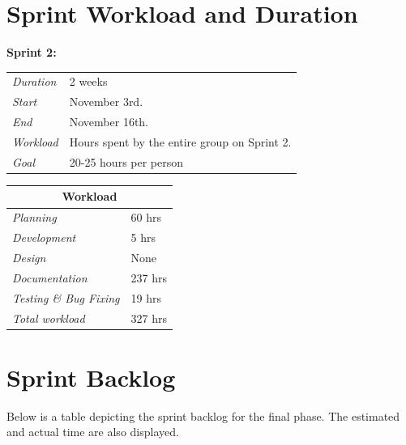\section{Sprint Workload and Duration}
\label{sec:FinalWorkload}
%
\begin{minipage}{\linewidth}
\centering
\setlength{\tabcolsep}{22pt}
\textbf{Sprint 2:} 
\smallskip
{}
\begin{tabular}{ |l l| }
	\hline
	\it{Duration} & 2 weeks \\
	\it{Start} & November 3rd. \\
	\it{End} & November 16th. \\
	\it{Workload} & Hours spent by the entire group on Sprint 2. \\
	\it{Goal} & 20-25 hours per person \\
	\hline
\end{tabular}
\end{minipage}
\bigskip
%
\begin{minipage}{\linewidth}
\setlength{\tabcolsep}{25pt}
\centering
{}
\begin{tabular}{ |l|l| }
	\hline
	\multicolumn{2}{|c|}{\cellcolor{gray!25} Workload} \\
	\hline
	\it{Planning} & 60 hrs \\
	\it{Development} & 5 hrs \\
	\it{Design} & None \\
	\it{Documentation} & 237 hrs \\
	\it{Testing \& Bug Fixing} & 19 hrs \\
	\hline
	\it{Total workload} & 327 hrs \\
	\hline
\end{tabular}
\end{minipage}

\section{Sprint Backlog}
\label{sec:FinalBacklog}

Below is a table depicting the sprint backlog for the final phase. The estimated and actual time are also displayed.

